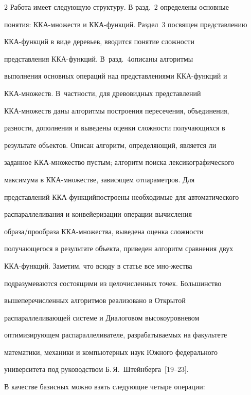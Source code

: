 \begin{multicols}{2}
Работа имеет следующую структуру. В разд.~2 определены основные

понятия: ККА-мно\-жеств и ККА-функ\-ций. Раздел~3 посвящен представлению

ККА-функ\-ций в виде деревьев, вводится понятие сложности

представления ККА-функ\-ций. В~разд.~4\linebreak описаны алгоритмы

выполнения основных опе\-раций над представлениями ККА-функ\-ций и\linebreak

ККА-мно\-жеств. В~част\-ности, для древовидных пред\-став\-ле\-ний

ККА-мно\-жеств даны алгоритмы по\-стро\-ения пересечения, объединения,

разности, дополнения и выведены оценки сложности получающихся в

результате объектов. Описан алгоритм, определяющий, является ли

заданное ККА-мно\-жест\-во пустым; алгоритм поиска лексикографического

максимума в ККА-мно\-жест\-ве, зависящем от\linebreak параметров. Для

представлений ККА-функ\-ций\linebreak построены необходимые для автоматического

распараллеливания и конвейеризации операции вы\-чис\-ле\-ния

образа/прообраза ККА-мно\-же\-ст\-ва, выведена оценка сложности

получающегося в результате объекта, приведен алгоритм сравнения двух

ККА-функ\-ций. Заметим, что всюду в статье все мно-\linebreak жества

подразумеваются состоящими из це\-ло\-чис\-лен\-ных точек. Большинство

вышеперечисленных алгоритмов реализовано в Открытой

распараллеливающей системе и Диалоговом высокоуровневом

оптимизирующем распараллеливателе, разрабатываемых на факультете

математики, механики и компьютерных наук Южного федерального

университета под руководством Б.\,Я.~Штейнберга~[19--23].



В качестве базисных можно взять следующие четыре операции:


\end{multicols}
